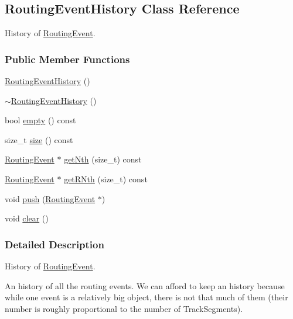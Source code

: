 \hypertarget{classKite_1_1RoutingEventHistory}{\subsection{Routing\-Event\-History Class Reference}
\label{classKite_1_1RoutingEventHistory}
}


History of \hyperlink{classKite_1_1RoutingEvent}{Routing\-Event}.  


\subsubsection*{Public Member Functions}
\begin{DoxyCompactItemize}
\item 
\hyperlink{classKite_1_1RoutingEventHistory_af286a3887c4925a37eadc8018d584aa3}{Routing\-Event\-History} ()
\item 
\hyperlink{classKite_1_1RoutingEventHistory_a5a7671b3e27e93b018cf407a7eba9ce7}{$\sim$\-Routing\-Event\-History} ()
\item 
bool \hyperlink{classKite_1_1RoutingEventHistory_ac6e61de369e994009e36f344f99c15ad}{empty} () const 
\item 
size\-\_\-t \hyperlink{classKite_1_1RoutingEventHistory_aac782da1f912bceb5d8ad00c8dc892ac}{size} () const 
\item 
\hyperlink{classKite_1_1RoutingEvent}{Routing\-Event} $\ast$ \hyperlink{classKite_1_1RoutingEventHistory_a9ce7f1401ea13073d9b6fa00a97ed773}{get\-Nth} (size\-\_\-t) const 
\item 
\hyperlink{classKite_1_1RoutingEvent}{Routing\-Event} $\ast$ \hyperlink{classKite_1_1RoutingEventHistory_a575fe1cb5a74febfd081169e18d6ad6e}{get\-R\-Nth} (size\-\_\-t) const 
\item 
void \hyperlink{classKite_1_1RoutingEventHistory_ac802427673567526d06af911e94f7216}{push} (\hyperlink{classKite_1_1RoutingEvent}{Routing\-Event} $\ast$)
\item 
void \hyperlink{classKite_1_1RoutingEventHistory_ac8bb3912a3ce86b15842e79d0b421204}{clear} ()
\end{DoxyCompactItemize}


\subsubsection{Detailed Description}
History of \hyperlink{classKite_1_1RoutingEvent}{Routing\-Event}. 

An history of all the routing events. We can afford to keep an history because while one event is a relatively big object, there is not that much of them (their number is roughly proportional to the number of Track\-Segments).

